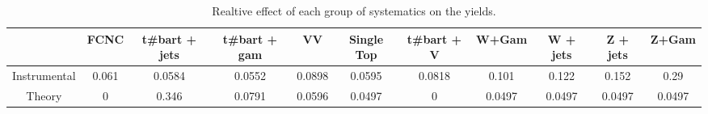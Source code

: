 \begin{table}[htbp]
\begin{center}
\begin{tabular}{|c|c|c|c|c|c|c|c|c|c|c|}
\hline 
      & FCNC      & t#bar{t} + jets      & t#bar{t} +  gam      & VV      & Single Top      & t#bar{t} + V      & W+Gam      & W + jets      & Z + jets      & Z+Gam \\ 
\hline 
 Instrumental & 0.061 & 0.0584 & 0.0552 & 0.0898 & 0.0595 & 0.0818 & 0.101 & 0.122 & 0.152 & 0.29 \\ 
 Theory & 0 & 0.346 & 0.0791 & 0.0596 & 0.0497 & 0 & 0.0497 & 0.0497 & 0.0497 & 0.0497 \\ 
\hline 
\end{tabular} 
\caption{Realtive effect of each group of systematics on the yields.} 
\end{center} 
\end{table} 
